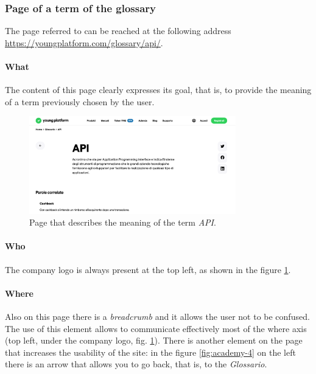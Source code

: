 \subsubsection{Page of a term of the glossary}

The page referred to can be reached at the following address \\
\href{https://youngplatform.com/glossary/api/}{https://youngplatform.com/glossary/api/}.

\paragraph{What}

The content of this page clearly expresses its goal, that is, to provide 
the meaning of a term previously chosen by the user.

\begin{figure}[H]
  \centering
  \includegraphics[width=0.80\textwidth]{res/images/internal-pages/glossary/glossary-4.png}
  \caption{Page that describes the meaning of the term \textit{API}.}
  \label{fig:glossary-4}
\end{figure}

\paragraph{Who}

The company logo is always present at the top left, as shown in the figure 
\ref{fig:glossary-4}.

\paragraph{Where}

Also on this page there is a \textit{breadcrumb} and it allows the user 
not to be confused. The use of this element allows to communicate 
effectively most of the where axis (top left, under the company logo, 
fig. \ref{fig:glossary-4}). There is another element on the page that 
increases the usability of the site: in the figure \ref{fig:academy-4} on 
the left there is an arrow that allows you to go back, that is, to the 
\textit{Glossario}. 

